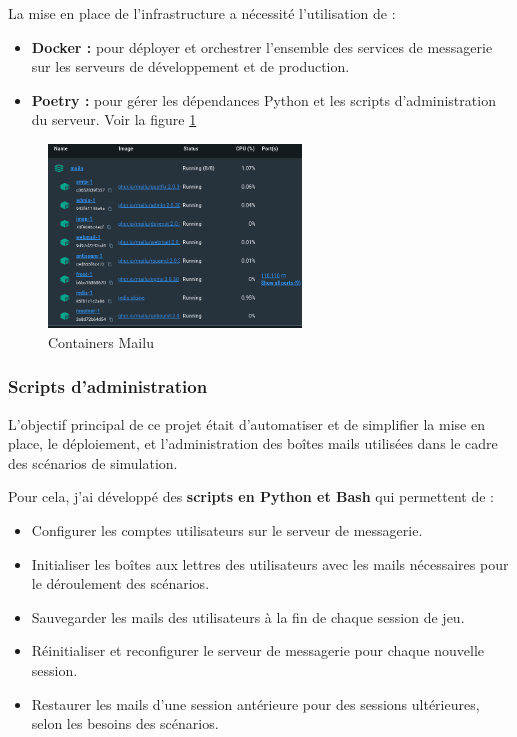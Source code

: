 \noindent La mise en place de l'infrastructure a nécessité l'utilisation de :
\begin{itemize}
	\item \textbf{Docker :}  pour déployer et orchestrer l'ensemble des services de messagerie sur les serveurs de développement et de production.
	\item \textbf{Poetry :}  pour gérer les dépendances Python et les scripts d'administration du serveur. Voir la figure \ref{fig:docker_mpc}
\end{itemize}

\begin{figure}[h]
	\center
	\includegraphics[width=0.6\textwidth]{./images/docker_mpc.png}
	\caption[Liste des conteneurs de Mailu]{Containers Mailu}\label{fig:docker_mpc}
\end{figure}


\subsubsection{Scripts d'administration}

L'objectif principal de ce projet était d'automatiser et de simplifier la mise en place, le déploiement, et l'administration des boîtes mails utilisées dans le cadre des scénarios de simulation.

Pour cela, j'ai développé des \textbf{scripts en Python et Bash} qui permettent de :

\begin{itemize}
	\item Configurer les comptes utilisateurs sur le serveur de messagerie.
	\item Initialiser les boîtes aux lettres des utilisateurs avec les mails nécessaires pour le déroulement des scénarios.
	\item Sauvegarder les mails des utilisateurs à la fin de chaque session de jeu.
	\item Réinitialiser et reconfigurer le serveur de messagerie pour chaque nouvelle session.
	\item Restaurer les mails d’une session antérieure pour des sessions ultérieures, selon les besoins des scénarios.
\end{itemize}

